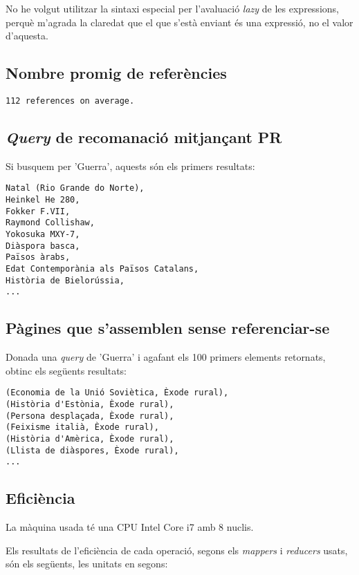 \documentclass{article}
\begin{document}
No he volgut utilitzar la sintaxi especial per l'avaluació \emph{lazy} de les
expressions, perquè m'agrada la claredat que el que s'està enviant és una
expressió, no el valor d'aquesta.

\subsection{Nombre promig de referències}

\begin{verbatim}
112 references on average.
\end{verbatim}

\subsection{\emph{Query} de recomanació mitjançant PR}

Si busquem per 'Guerra', aquests són els primers resultats:

\begin{verbatim}
Natal (Rio Grande do Norte),
Heinkel He 280,
Fokker F.VII,
Raymond Collishaw,
Yokosuka MXY-7,
Diàspora basca,
Països àrabs,
Edat Contemporània als Països Catalans,
Història de Bielorússia,
...
\end{verbatim}

\subsection{Pàgines que s'assemblen sense referenciar-se}

Donada una \emph{query} de 'Guerra' i agafant els 100 primers elements retornats,
obtinc els següents resultats:

\begin{verbatim}
(Economia de la Unió Soviètica, Èxode rural),
(Història d'Estònia, Èxode rural),
(Persona desplaçada, Èxode rural),
(Feixisme italià, Èxode rural),
(Història d'Amèrica, Èxode rural),
(Llista de diàspores, Èxode rural),
...
\end{verbatim}

\subsection{Eficiència}

La màquina usada té una CPU Intel Core i7 amb 8 nuclis.

Els resultats de l'eficiència de cada operació, segons els \emph{mappers} i
\emph{reducers} usats, són els següents, les unitats en segons:
\end{document}
